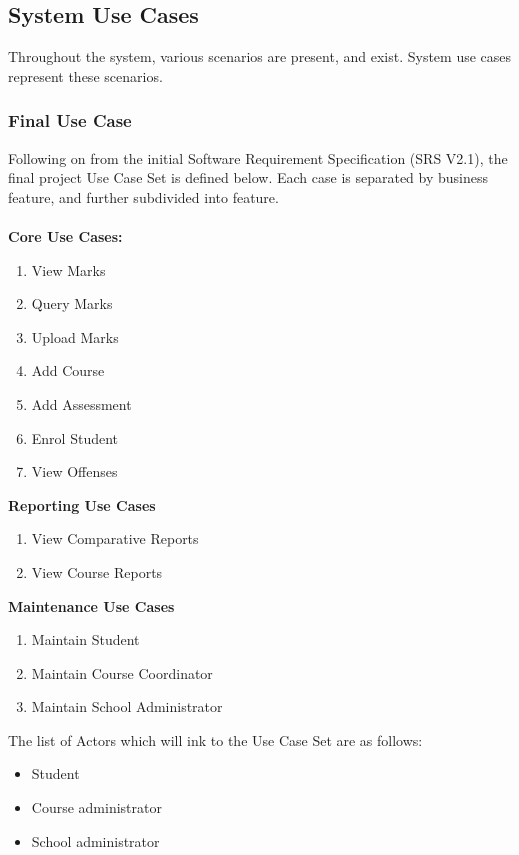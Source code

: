 \documentclass[paper=a4, fontsize=11pt]{scrartcl}
\numberwithin{equation}{section}		%
\numberwithin{figure}{section}			%
\numberwithin{table}{section}				%
\begin{document}
\subsection{System Use Cases}
Throughout the system, various scenarios are present, and exist. System use cases represent these scenarios.
\subsubsection{Final Use Case}
Following on from the initial Software Requirement Specification (SRS V2.1), the final project Use Case Set is defined below. Each case is separated by business feature, and further subdivided into feature.\\\\ \textbf{Core Use Cases:}
\begin{enumerate}
\item View Marks
\item Query Marks
\item Upload Marks
\item Add Course
\item Add Assessment
\item Enrol Student
\item View Offenses
\end{enumerate}
\textbf{Reporting Use Cases}
\begin{enumerate}
\item View Comparative Reports
\item View Course Reports
\end{enumerate}
\textbf{Maintenance Use Cases}
\begin{enumerate}
\item Maintain Student
\item Maintain Course Coordinator
\item Maintain School Administrator
\end{enumerate}

The list of Actors which will ink to the Use Case Set are as follows:
\begin{itemize}
\item Student
\item Course administrator
\item School administrator
\end{itemize}
\end{document}
